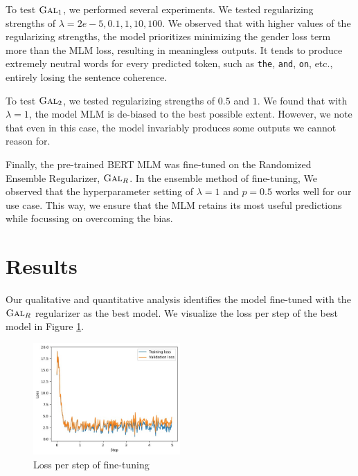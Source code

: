\documentclass[10pt,twocolumn,letterpaper]{article}
\begin{document}
To test $\textsc{Gal}_{1}$, we performed several experiments.
We tested regularizing strengths of $\lambda = 2e-5, 0.1, 1, 10, 100$.
We observed that with higher values of the regularizing strengths, the model prioritizes minimizing the gender loss term more than the MLM loss, resulting in meaningless outputs.
It tends to produce extremely neutral words for every predicted token, such as \texttt{the}, \texttt{and}, \texttt{on}, etc., entirely losing the sentence coherence.

To test $\textsc{Gal}_{2}$, we tested regularizing strengths of $0.5$ and $1$.
We found that with $\lambda = 1$, the model MLM is de-biased to the best possible extent.
However, we note that even in this case, the model invariably produces some outputs we cannot reason for.

Finally, the pre-trained BERT MLM was fine-tuned on the Randomized Ensemble Regularizer, $\textsc{Gal}_{R}$.
In the ensemble method of fine-tuning,
We observed that the hyperparameter setting of $\lambda = 1$ and $p = 0.5$ works well for our use case.
This way, we ensure that the MLM retains its most useful predictions while focussing on overcoming the bias.

\section{Results}
Our qualitative and quantitative analysis identifies the model fine-tuned with the $\textsc{Gal}_{R}$ regularizer as the best model.
We visualize the loss per step of the best model in Figure \ref{fig:loss}.
\begin{figure}
    \centering
    \includegraphics[width=0.5\textwidth]{Assets/loss.jpg}
    \caption{Loss per step of fine-tuning}
    \label{fig:loss}
\end{figure}
\end{document}

